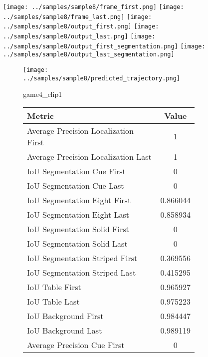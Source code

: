 \begin{figure}
    \texttt{[image: ../samples/sample8/frame\_first.png]}
    \texttt{[image: ../samples/sample8/frame\_last.png]}
    \newline
    \texttt{[image: ../samples/sample8/output\_first.png]}
    \texttt{[image: ../samples/sample8/output\_last.png]}
    \newline
    \texttt{[image: ../samples/sample8/output\_first\_segmentation.png]}
    \texttt{[image: ../samples/sample8/output\_last\_segmentation.png]}
    \newline
    \begin{subfigure}[b]{0.49\textwidth}
        \vspace{20pt}
        \texttt{[image: ../samples/sample8/predicted\_trajectory.png]}
        \caption*{game4\_clip1}
    \end{subfigure}
\begin{subfigure}[b]{0.49\textwidth}
    \begin{tabular}{|l|c|}
        \hline
        \textbf{Metric} & \textbf{Value} \\
        \hline
        Average Precision Localization First & 1 \\
        Average Precision Localization Last & 1 \\
        \hline
        IoU Segmentation Cue First & 0 \\
        IoU Segmentation Cue Last & 0 \\
        IoU Segmentation Eight First & 0.866044 \\
        IoU Segmentation Eight Last & 0.858934 \\
        IoU Segmentation Solid First & 0 \\
        IoU Segmentation Solid Last & 0 \\
        IoU Segmentation Striped First & 0.369556 \\
        IoU Segmentation Striped Last & 0.415295 \\
        \hline
        IoU Table First & 0.965927 \\
        IoU Table Last & 0.975223 \\
        IoU Background First & 0.984447 \\
        IoU Background Last & 0.989119 \\
        \hline
        Average Precision Cue First & 0 \\

\end{tabular}
\end{subfigure}
\end{figure}
